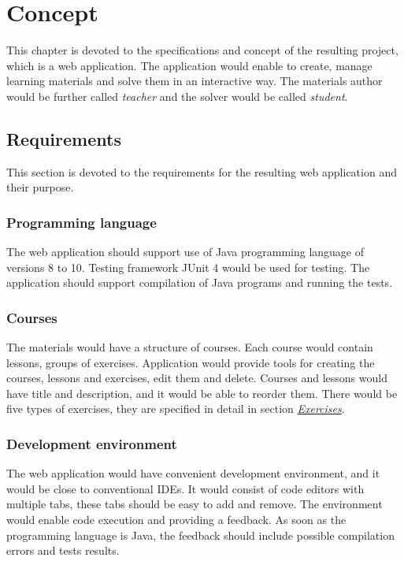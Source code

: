 \chapter[Concept]{Concept}

\label{ch:concept}

This chapter is devoted to the specifications and concept of the resulting project, which is a web application. The application would enable to create, manage learning materials and solve them in an interactive way. The materials author would be further called \textit{teacher} and the solver would be called \textit{student}.

    \section{Requirements}
    
    This section is devoted to the requirements for the resulting web application and their purpose.
    
        \subsection{Programming language}
        The web application should support use of Java programming language of versions 8 to 10. Testing framework JUnit 4 would be used for testing. The application should support compilation of Java programs and running the tests.
        
    
        \subsection{Courses}
        The materials would have a structure of courses. Each course would contain lessons, groups of exercises. Application would provide tools for creating the courses, lessons and exercises, edit them and delete. Courses and lessons would have title and description, and it would be able to reorder them. There would be five types of exercises, they are specified in detail in section \hyperref[subsec:exercise-types] {\textit{Exercises}}.
        
        \subsection{Development environment}
        The web application would have convenient development environment, and it would be close to conventional IDEs. It would consist of code editors with multiple tabs, these tabs should be easy to add and remove. The environment would enable code execution and providing a feedback. As soon as the programming language is Java, the feedback should include possible compilation errors and tests results.
        
